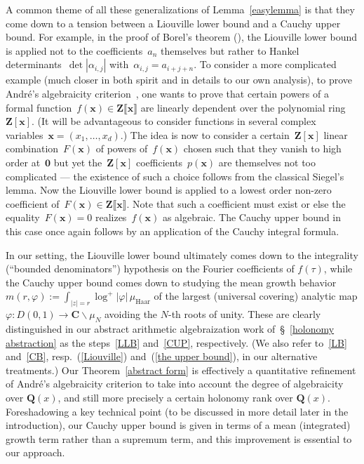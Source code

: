 \documentclass[10pt]{amsart}
\def\SSSS{\S}
\renewcommand\setminus{\smallsetminus}
\def\Z{\mathbf{Z}}
\def\Q{\mathbf{Q}}
\theoremstyle{remark}
\numberwithin{equation}{subsection}
\def\C{\mathbf{C}}
\begin{document}
A common theme of all these generalizations of Lemma~\ref{easylemma} is that they   come down to a tension between
a Liouville lower bound and a Cauchy upper bound. For example, in the  proof of Borel's theorem (\cite[Ch~5.3]{Amice}), the Liouville lower bound is applied
not to the coefficients~$a_n$ themselves but rather to Hankel determinants~$\det | \alpha_{i,j}|$ with~$\alpha_{i,j}=a_{i+j+n}$. 
To consider a more complicated example (much closer in both spirit and in details to our own analysis), to prove Andr\'e's algebraicity criterion~\cite[Th\'eor\`eme~5.4.3]{Andre},
one wants to prove that certain powers of a formal function~$f(\mathbf{x}) \in \mathbf{Z}\llbracket \mathbf{x} \rrbracket$ are linearly dependent over the polynomial ring $\Z[\mathbf{x}]$. (It will be advantageous to consider
functions in several complex variables~$\mathbf{x} = (x_1,\ldots,x_d)$.)  The idea is now to consider a certain~$\Z[\mathbf{x}]$ linear combination~$F(\mathbf{x})$ of  powers 
of~$f(\mathbf{x})$ chosen such that they vanish to high order at~$\mathbf{0}$ but yet the~$\Z[\mathbf{x}]$ coefficients~$p(\mathbf{x})$ are  themselves not too complicated ---
the existence of such a choice follows from the classical Siegel's lemma. Now the Liouville lower bound is applied to a lowest order  non-zero coefficient of~$F(\mathbf{x}) \in \mathbf{Z}\llbracket \mathbf{x}\rrbracket$.
Note that such a coefficient must exist or else the equality~$F(\mathbf{x}) = 0$ realizes~$f(\mathbf{x})$ as algebraic. 
The Cauchy upper bound  in this case once again
follows by an application of the Cauchy integral formula. 



In our setting, the Liouville lower bound ultimately  comes down to the integrality (``bounded denominators'') hypothesis on the Fourier coefficients of $f(\tau)$, while the 
Cauchy upper bound
comes down to studying the mean growth behavior $m(r,\varphi) := \int_{|z| = r} \log^+{|\varphi|} \, \mu_{\mathrm{Haar}}$ of the largest (universal covering) analytic map $\varphi : D(0,1) \to \C \setminus \mu_N$ avoiding the $N$-th roots of unity. These are clearly distinguished in our abstract arithmetic algebraization work of~\SSSS~\ref{holonomy abstraction} as the steps~\eqref{LLB} and~\eqref{CUP}, respectively. (We also refer to~\eqref{LB} and~\eqref{CB}, resp.~(\ref{Liouville}) and~(\ref{the upper bound}), in our alternative treatments.)
Our Theorem~\ref{abstract form} is effectively a quantitative refinement of Andr\'e's algebraicity criterion to take into account the degree of algebraicity over $\Q(x)$, and still more precisely a certain holonomy rank over $\Q(x)$. Foreshadowing a key technical point (to be discussed in more detail later in the introduction), our Cauchy upper bound is given in terms
of a mean (integrated) growth term rather than a supremum term, and  this  improvement is essential to our approach.
\end{document}
